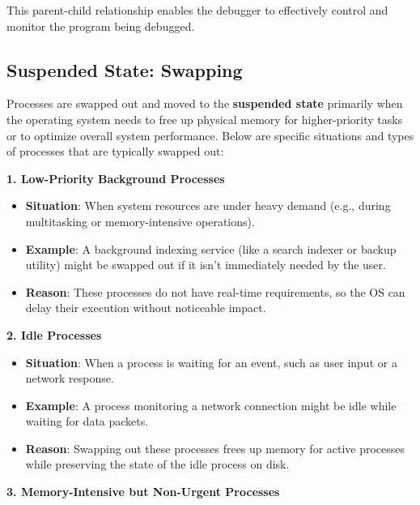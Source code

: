 \documentclass[a4paper]{book}
\begin{document}
This parent-child relationship enables the debugger to effectively control and monitor the program being debugged.

\subsection{Suspended State: Swapping}

Processes are swapped out and moved to the \textbf{suspended state} primarily when the operating system needs to free up physical memory for higher-priority tasks or to optimize overall system performance. Below are specific situations and types of processes that are typically swapped out:

\hrulefill

\textbf{1. Low-Priority Background Processes}

\begin{itemize}
\item 
\textbf{Situation}: When system resources are under heavy demand (e.g., during multitasking or memory-intensive operations).

\item 
\textbf{Example}: A background indexing service (like a search indexer or backup utility) might be swapped out if it isn't immediately needed by the user.

\item 
\textbf{Reason}: These processes do not have real-time requirements, so the OS can delay their execution without noticeable impact.
\end{itemize}

\hrulefill

\textbf{2. Idle Processes}

\begin{itemize}
\item 
\textbf{Situation}: When a process is waiting for an event, such as user input or a network response.

\item 
\textbf{Example}: A process monitoring a network connection might be idle while waiting for data packets.

\item 
\textbf{Reason}: Swapping out these processes frees up memory for active processes while preserving the state of the idle process on disk.

\end{itemize}

\hrulefill

\textbf{3. Memory-Intensive but Non-Urgent Processes}
\end{document}
